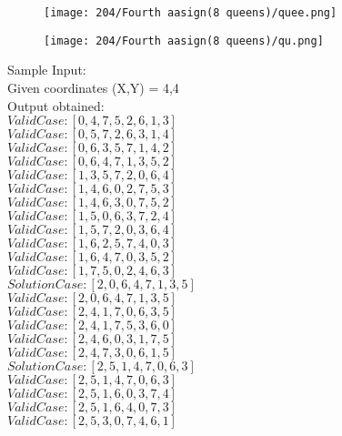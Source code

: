 \documentclass{article}
\begin{document}
	\begin{figure}[h!]
		\centering
		\texttt{[image: 204/Fourth aasign(8 queens)/quee.png]}
	\end{figure}	
	
	\begin{figure}[h!]
		\centering
		\texttt{[image: 204/Fourth aasign(8 queens)/qu.png]}
	\end{figure}
	
	\noindent
	Sample Input:\\
	Given coordinates (X,Y) = 4,4\\
	\noindent
	Output obtained:\\
	
	$Valid Case   : [0, 4, 7, 5, 2, 6, 1, 3]$\\
	$Valid Case   : [0, 5, 7, 2, 6, 3, 1, 4]$\\
	$Valid Case   : [0, 6, 3, 5, 7, 1, 4, 2]$\\
	$Valid Case   : [0, 6, 4, 7, 1, 3, 5, 2]$\\
	$Valid Case   : [1, 3, 5, 7, 2, 0, 6, 4]$\\
	$Valid Case   : [1, 4, 6, 0, 2, 7, 5, 3]$\\
	$Valid Case   : [1, 4, 6, 3, 0, 7, 5, 2]$\\
	$Valid Case   : [1, 5, 0, 6, 3, 7, 2, 4]$\\
	$Valid Case   : [1, 5, 7, 2, 0, 3, 6, 4]$\\
	$Valid Case   : [1, 6, 2, 5, 7, 4, 0, 3]$\\
	$Valid Case   : [1, 6, 4, 7, 0, 3, 5, 2]$\\
	$Valid Case   : [1, 7, 5, 0, 2, 4, 6, 3]$\\
	$Solution Case: [2, 0, 6, 4, 7, 1, 3, 5]$\\
	$Valid Case   : [2, 0, 6, 4, 7, 1, 3, 5]$\\
	$Valid Case   : [2, 4, 1, 7, 0, 6, 3, 5]$\\
	$Valid Case   : [2, 4, 1, 7, 5, 3, 6, 0]$\\
	$Valid Case   : [2, 4, 6, 0, 3, 1, 7, 5]$\\
	$Valid Case   : [2, 4, 7, 3, 0, 6, 1, 5]$\\
	$Solution Case: [2, 5, 1, 4, 7, 0, 6, 3]$\\
	$Valid Case   : [2, 5, 1, 4, 7, 0, 6, 3]$\\
	$Valid Case   : [2, 5, 1, 6, 0, 3, 7, 4]$\\
	$Valid Case   : [2, 5, 1, 6, 4, 0, 7, 3]$\\
	$Valid Case   : [2, 5, 3, 0, 7, 4, 6, 1]$\\
\end{document}
